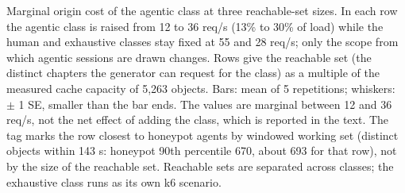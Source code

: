 Marginal origin cost of the agentic class at three reachable-set sizes. In each row the agentic class is raised from 12 to 36 req/s (13\% to 30\% of load) while the human and exhaustive classes stay fixed at 55 and 28 req/s; only the scope from which agentic sessions are drawn changes. Rows give the reachable set (the distinct chapters the generator can request for the class) as a multiple of the measured cache capacity of 5,263 objects. Bars: mean of 5 repetitions; whiskers: $\pm$ 1 SE, smaller than the bar ends. The values are marginal between 12 and 36 req/s, not the net effect of adding the class, which is reported in the text. The tag marks the row closest to honeypot agents by windowed working set (distinct objects within 143 s: honeypot 90th percentile 670, about 693 for that row), not by the size of the reachable set. Reachable sets are separated across classes; the exhaustive class runs as its own k6 scenario.
